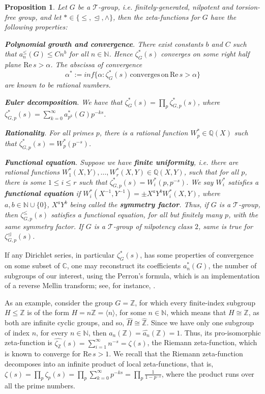 \documentclass[12pt]{article}
\newtheorem{proposition}[theorem]{Proposition}
\begin{document}
\begin{proposition}
Let $G$ be a $\mathcal{T}$-group, i.e. finitely-generated, nilpotent and torsion-free group, and let $\ast\in\{\leq,\trianglelefteq,\wedge\}$, then the zeta-functions for $G$ have the following properties:\par
\textbf{Polynomial growth and convergence}. There exist constants $b$ and $C$ such that $a_{n}^{\leq}(G)\leq{C}{n}^{b}$ for all $n\in\mathbb{N}$. Hence $\zeta_{G}^{\ast}(s)$ converges on some right half plane $\mathrm{Re}\,s>\alpha$. The abscissa of convergence \[\alpha^{\ast}:=inf\{\alpha : \zeta_{G}^{\ast}(s)\,\mathrm{converges}\,\mathrm{on}\,\mathrm{Re}\,s>\alpha\}\] are known to be rational numbers.\par
\textbf{Euler decomposition}.
We have that $\zeta_{G}^{\ast}(s)=\prod_{p}\zeta_{G,p}^{\ast}(s)$, where $\zeta_{G,p}^{\ast}(s)=\sum_{k=0}^{\infty}a_{p^k}^{\ast}(G)p^{-ks}$.\par
\textbf{Rationality}. For all primes $p$, there is a rational function $W_{p}^{\ast}\in\mathbb{Q}(X)$ such that $\zeta_{G,p}^{\ast}(s)=W_{p}^{\ast}(p^{-s})$.\par
\textbf{Functional equation}. Suppose we have \textbf{finite uniformity}, i.e. there are rational functions $W_{1}^{\ast}(X,Y),\dots,W_{r}^{\ast}(X,Y)\in\mathbb{Q}(X,Y)$, such that for all $p$, there is some $1\leq{i}\leq{r}$ such that $\zeta_{G,p}^{\ast}(s)=W_{i}^{\ast}(p,p^{-s})$. We say $W_{i}^{\ast}$ satisfies a \textbf{functional equation} if $W_{i}^{\ast}(X^{-1},Y^{-1})=\pm{X}^{a}{Y}^{b}{W_{i}^{\ast}(X,Y)}$, where $a,b\in\mathbb{N}\cup\{0\}$, $X^{a}Y^{b}$ being called the \textbf{symmetry factor}. Thus,
if $G$ is a $\mathcal{T}$-group, then $\zeta_{G,p}^{\leq}(s)$ satisfies a functional equation, for all but finitely many $p$, with the same symmetry factor. If $G$ is a $\mathcal{T}$-group of nilpotency class $2$, same is true for $\zeta_{G,p}^{\trianglelefteq}(s)$.
\end{proposition}
If any Dirichlet series, in particular $\zeta_{G}^{\ast}(s)$, has some properties of convergence on some subset of $\mathbb{C}$, one may reconstruct its coefficients $a_{n}^{\ast}(G)$, the number of subgroups of our interest, using the Perron's formula, which is an implementation of a reverse Mellin transform; see, for instance, \cite{MontgomeryVaughan}.\par
As an example, consider the group $G=\mathbb{Z}$, for which every finite-index subgroup $H\leq{\mathbb{Z}}$ is of the form $H=n\mathbb{Z}=\langle n\rangle$, for some $n\in\mathbb{N}$, which means that $H\cong \mathbb{Z}$, as both are infinite cyclic groups, and so, $\widehat{H}\cong\widehat{\mathbb{Z}}$. Since we have only one subgroup of index $n$, for every $n\in\mathbb{N}$, then $a_n(\mathbb{Z})=\hat{a_n}(\mathbb{Z})=1$. Thus, its pro-isomorphic zeta-function is $\hat{\zeta_{\mathbb{Z}}}(s)=\sum_{i=1}^{\infty}n^{-s}=\zeta(s)$, the Riemann zeta-function, which is known to converge for $\mathrm{Re}\,s>1$. We recall that the Riemann zeta-function decomposes into an infinite product of local zeta-functions, that is, $\zeta(s)=\prod_p\zeta_p(s)=\prod_p\sum_{k=0}^\infty p^{-ks}=\prod_p\frac{1}{1-p^{-s}}$, where the product runs over all the prime numbers.\par
\end{document}

